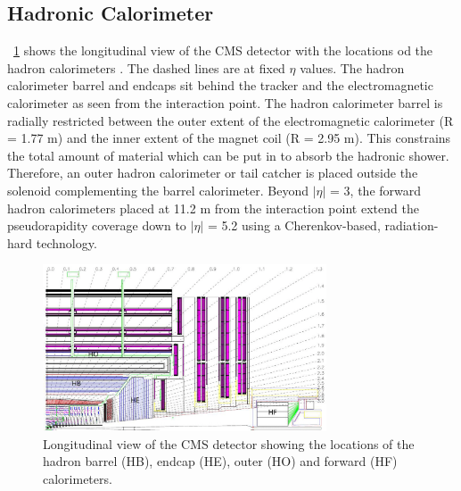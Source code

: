 \subsection{Hadronic Calorimeter}
\figurename~\ref{HCAL_layout} shows the longitudinal view of the CMS detector with the locations od the hadron calorimeters \cite{HCAL}. The dashed lines are at fixed $\eta$ values. The hadron calorimeter barrel and endcaps sit behind the tracker and the electromagnetic calorimeter as seen from the interaction point. The hadron calorimeter barrel is radially restricted between the outer extent of the electromagnetic calorimeter (R = 1.77 m) and the inner extent of the magnet coil (R = 2.95 m). This constrains the total amount of material which can be put in to absorb the hadronic shower. Therefore, an outer hadron calorimeter or tail catcher is placed outside the solenoid complementing the barrel calorimeter. Beyond $|\eta|$ = 3, the forward hadron calorimeters placed at 11.2 m from the interaction point extend the pseudorapidity coverage down to $|\eta|$ = 5.2 using a Cherenkov-based, radiation-hard technology. 
\begin{figure}[htbp]
\centering
\includegraphics[width=0.75\textwidth]{Images/HCAL_layout}
\caption{Longitudinal view of the CMS detector showing the locations of the hadron barrel (HB), endcap (HE), outer (HO) and forward (HF) calorimeters.}
\label{HCAL_layout}
\end{figure}
